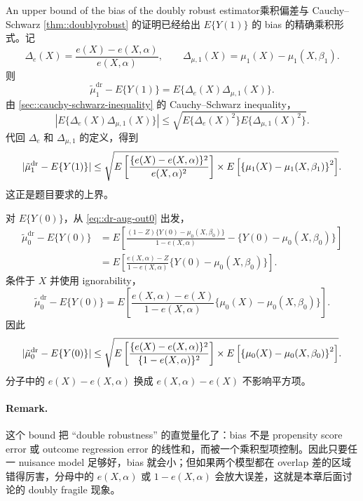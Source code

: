 \begin{exercisesolution}{An upper bound of the bias of the doubly robust estimator}{乘积偏差与 Cauchy--Schwarz}
\cref{thm::doublyrobust} 的证明已经给出 $E\{Y(1)\}$ 的 bias 的精确乘积形式。记
\[
\Delta_e(X)=\frac{e(X)-e(X,\alpha)}{e(X,\alpha)},\qquad
\Delta_{\mu,1}(X)=\mu_1(X)-\mu_1(X,\beta_1).
\]
则
\[
\tilde{\mu}_1^{\mathrm{dr}}-E\{Y(1)\}
=E\{\Delta_e(X)\Delta_{\mu,1}(X)\}.
\]
由 \cref{sec::cauchy-schwarz-inequality} 的 Cauchy--Schwarz inequality，
\[
\left|E\{\Delta_e(X)\Delta_{\mu,1}(X)\}\right|
\leq
\sqrt{E\{\Delta_e(X)^2\}E\{\Delta_{\mu,1}(X)^2\}}.
\]
代回 $\Delta_e$ 和 $\Delta_{\mu,1}$ 的定义，得到
\[
 |   \tilde{\mu}_1^\textup{dr} - E\{  Y(1) \}  |  \leq
\sqrt{
E\left[   \frac{ \{  e(X) - e(X,\alpha)\}^2  }{  e(X,\alpha)^2 }  \right] \times
E\left[  \left\{  \mu_1(X) -  \mu_1(X, \beta_1)   \right\}^2 \right]
}.
\]
这正是题目要求的上界。

对 $E\{Y(0)\}$，从 \cref{eq::dr-aug-out0} 出发，
\begin{align*}
\tilde{\mu}_0^{\mathrm{dr}}-E\{Y(0)\}
&=E\left[
\frac{(1-Z)\{Y(0)-\mu_0(X,\beta_0)\}}{1-e(X,\alpha)}
-\{Y(0)-\mu_0(X,\beta_0)\}
\right] \\
&=E\left[
\frac{e(X,\alpha)-Z}{1-e(X,\alpha)}
\{Y(0)-\mu_0(X,\beta_0)\}
\right].
\end{align*}
条件于 $X$ 并使用 ignorability，
\[
\tilde{\mu}_0^{\mathrm{dr}}-E\{Y(0)\}
=E\left[
\frac{e(X,\alpha)-e(X)}{1-e(X,\alpha)}
\{\mu_0(X)-\mu_0(X,\beta_0)\}
\right].
\]
因此
\[
 |   \tilde{\mu}_0^\textup{dr} - E\{  Y(0) \}  |  \leq
\sqrt{
E\left[   \frac{ \{  e(X) - e(X,\alpha)\}^2  }{  \{1-e(X,\alpha)\}^2 }  \right] \times
E\left[  \left\{  \mu_0(X) -  \mu_0(X, \beta_0)   \right\}^2 \right]
}.
\]
分子中的 $e(X)-e(X,\alpha)$ 换成 $e(X,\alpha)-e(X)$ 不影响平方项。

\paragraph{Remark.}
这个 bound 把 ``double robustness'' 的直觉量化了：bias 不是 propensity score error 或 outcome regression error 的线性和，而被一个乘积型项控制。因此只要任一 nuisance model 足够好，bias 就会小；但如果两个模型都在 overlap 差的区域错得厉害，分母中的 $e(X,\alpha)$ 或 $1-e(X,\alpha)$ 会放大误差，这就是本章后面讨论的 doubly fragile 现象。
\end{exercisesolution}

